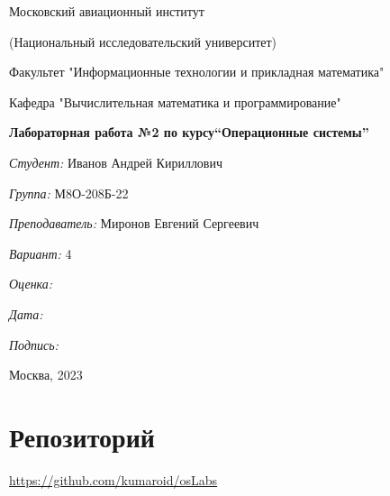 \documentclass[a4paper, 12pt]{article}
\begin{document}
\thispagestyle{empty}	
\begin{center}
	Московский авиационный институт
	
	(Национальный исследовательский университет)
	
	Факультет "Информационные технологии и прикладная математика"
	
	Кафедра "Вычислительная математика и программирование"
	
\end{center}
\vspace{40ex}
\begin{center}
	\textbf{\large{Лабораторная работа №2 по курсу\linebreak \textquotedblleft Операционные системы\textquotedblright}}
\end{center}
\vspace{35ex}
\begin{flushright}
	\textit{Студент: } Иванов Андрей Кириллович
	
	\vspace{2ex}
	\textit{Группа: } М8О-208Б-22
	
	\vspace{2ex}
	\textit{Преподаватель: } Миронов Евгений Сергеевич
	
	\vspace{2ex}
	\textit{Вариант: } 4
	
	\vspace{2ex}
	\textit{Оценка: } \underline{\quad\quad\quad\quad\quad\quad}
	
	 \vspace{2ex}
	\textit{Дата: } \underline{\quad\quad\quad\quad\quad\quad}
	
	\vspace{2ex}
	\textit{Подпись: } \underline{\quad\quad\quad\quad\quad\quad}
	
\end{flushright}

\vspace{5ex}

\begin{vfill}
	\begin{center}
		Москва, 2023
	\end{center}	
\end{vfill}
\newpage


\begingroup
\color{black}
\tableofcontents\newpage
\endgroup

\section{Репозиторий}
\href{https://github.com/kumaroid/osLabs}{https://github.com/kumaroid/osLabs}
\end{document}
